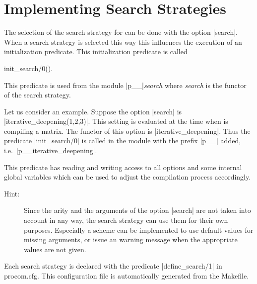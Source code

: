 
\section{Implementing Search Strategies}


The selection of the search strategy for \ProCom{} can be done with the option
|search|. When  a  search strategy is   selected this way this  influences the
execution  of  an initialization predicate.   This initialization predicate is
called

\Predicate init\_search/0().

This predicate is used from the  module |p__|{\em search}\/ where {\em search}
is the functor of the search strategy.

Let us consider an example. Suppose the option |search| is
|iterative_deepening(1,2,3)|.  This setting is evaluated at the time when
\ProCom{} is compiling a matrix.  The functor of this option is
|iterative_deepening|.  Thus the predicate |init_search/0| is called in the
module with the prefix |p__| added, i.e.\ |p__iterative_deepening|.

This predicate has reading and writing access to all options and some internal
global variables which can be used to adjust the compilation process
accordingly.

\begin{description}
\item [Hint:] Since the arity and the arguments of the option |search| are not
  taken  into account in any way,  the search strategy can  use them for their
  own purposes.  Especially a scheme can  be implemented to use default values
  for  missing arguments,  or issue  an  warning message  when the appropriate
  values are not given.
\end{description}

Each search strategy is declared with  the predicate |define_search/1| in {\sf
  procom.cfg}. This  configuration  file is automatically  generated  from the
{\sf Makefile}.

